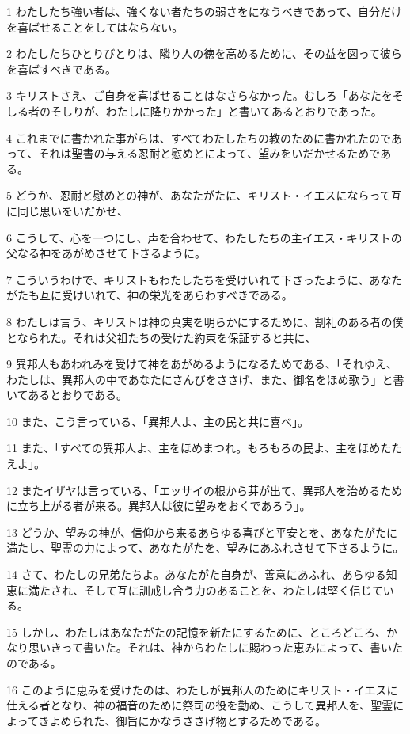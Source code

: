 \par 1 わたしたち強い者は、強くない者たちの弱さをになうべきであって、自分だけを喜ばせることをしてはならない。
\par 2 わたしたちひとりびとりは、隣り人の徳を高めるために、その益を図って彼らを喜ばすべきである。
\par 3 キリストさえ、ご自身を喜ばせることはなさらなかった。むしろ「あなたをそしる者のそしりが、わたしに降りかかった」と書いてあるとおりであった。
\par 4 これまでに書かれた事がらは、すべてわたしたちの教のために書かれたのであって、それは聖書の与える忍耐と慰めとによって、望みをいだかせるためである。
\par 5 どうか、忍耐と慰めとの神が、あなたがたに、キリスト・イエスにならって互に同じ思いをいだかせ、
\par 6 こうして、心を一つにし、声を合わせて、わたしたちの主イエス・キリストの父なる神をあがめさせて下さるように。
\par 7 こういうわけで、キリストもわたしたちを受けいれて下さったように、あなたがたも互に受けいれて、神の栄光をあらわすべきである。
\par 8 わたしは言う、キリストは神の真実を明らかにするために、割礼のある者の僕となられた。それは父祖たちの受けた約束を保証すると共に、
\par 9 異邦人もあわれみを受けて神をあがめるようになるためである、「それゆえ、わたしは、異邦人の中であなたにさんびをささげ、また、御名をほめ歌う」と書いてあるとおりである。
\par 10 また、こう言っている、「異邦人よ、主の民と共に喜べ」。
\par 11 また、「すべての異邦人よ、主をほめまつれ。もろもろの民よ、主をほめたたえよ」。
\par 12 またイザヤは言っている、「エッサイの根から芽が出て、異邦人を治めるために立ち上がる者が来る。異邦人は彼に望みをおくであろう」。
\par 13 どうか、望みの神が、信仰から来るあらゆる喜びと平安とを、あなたがたに満たし、聖霊の力によって、あなたがたを、望みにあふれさせて下さるように。
\par 14 さて、わたしの兄弟たちよ。あなたがた自身が、善意にあふれ、あらゆる知恵に満たされ、そして互に訓戒し合う力のあることを、わたしは堅く信じている。
\par 15 しかし、わたしはあなたがたの記憶を新たにするために、ところどころ、かなり思いきって書いた。それは、神からわたしに賜わった恵みによって、書いたのである。
\par 16 このように恵みを受けたのは、わたしが異邦人のためにキリスト・イエスに仕える者となり、神の福音のために祭司の役を勤め、こうして異邦人を、聖霊によってきよめられた、御旨にかなうささげ物とするためである。
